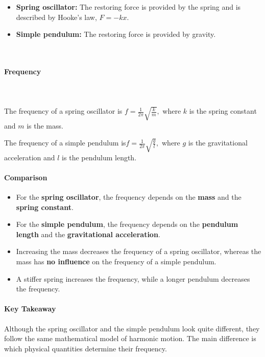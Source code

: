 \documentclass[a4paper,11pt]{article}
\begin{document}
\begin{itemize}
    \item \textbf{Spring oscillator:} The restoring force is provided by the spring and is described by Hooke's law,
    $
    F=-kx.
    $

    \item \textbf{Simple pendulum:} The restoring force is provided by gravity.
\end{itemize}
 \\ 

\paragraph{Frequency} \\ 

\\ 
The frequency of a spring oscillator is $f=\frac{1}{2\pi}\sqrt{\frac{k}{m}},$ where $k$ is the spring constant and $m$ is the mass.

The frequency of a simple pendulum is$f=\frac{1}{2\pi}\sqrt{\frac{g}{l}},$ where $g$ is the gravitational acceleration and $l$ is the pendulum length.

\paragraph{Comparison}

\begin{itemize}
    \item For the \textbf{spring oscillator}, the frequency depends on the \textbf{mass} and the \textbf{spring constant}.
    \item For the \textbf{simple pendulum}, the frequency depends on the \textbf{pendulum length} and the \textbf{gravitational acceleration}.
    \item Increasing the mass decreases the frequency of a spring oscillator, whereas the mass has \textbf{no influence} on the frequency of a simple pendulum.
    \item A stiffer spring increases the frequency, while a longer pendulum decreases the frequency.
\end{itemize}

\paragraph{Key Takeaway}

Although the spring oscillator and the simple pendulum look quite different, they follow the same mathematical model of harmonic motion. The main difference is which physical quantities determine their frequency.
\end{document}
